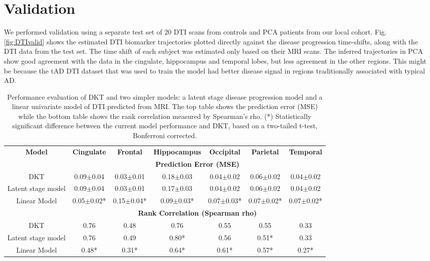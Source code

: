 \documentclass{llncs}
\begin{document}
\section{Validation}

We performed validation using a separate test set of 20 DTI scans from controls and PCA patients from our local cohort. Fig. \ref{fig:DTIvalid} shows the estimated DTI biomarker trajectories plotted directly against the disease progression time-shifts, along with the DTI data from the test set. The time shift of each subject was estimated only based on their MRI scans. The inferred trajectories in PCA show good agreement with the data in the cingulate, hippocampus and temporal lobes, but less agreement in the other regions. This might be because the tAD DTI dataset that was used to train the model had better disease signal in regions traditionally associated with typical AD.


\begin{table}
\begin{tabular}{c | c c c c c c}
\textbf{Model} & \textbf{Cingulate} & \textbf{Frontal} & \textbf{Hippocampus} & \textbf{Occipital} & \textbf{Parietal} & \textbf{Temporal}\\
& \multicolumn{6}{c}{\textbf{Prediction Error (MSE)}}\\
DKT & 0.09$\pm$0.04 & 0.03$\pm$0.01 & 0.18$\pm$0.03 & 0.04$\pm$0.02 & 0.06$\pm$0.02 & 0.04$\pm$0.02\\
Latent stage model & 0.09$\pm$0.04 & 0.03$\pm$0.01 & 0.17$\pm$0.03 & 0.04$\pm$0.02 & 0.06$\pm$0.02 & 0.04$\pm$0.02\\
Linear Model & 0.05$\pm$0.02* & 0.15$\pm$0.04* & 0.09$\pm$0.03* & 0.07$\pm$0.03* & 0.07$\pm$0.02* & 0.07$\pm$0.02*\\
& \multicolumn{6}{c}{\textbf{Rank Correlation (Spearman rho)}}\\
DKT  & 0.76  & 0.48  & 0.76  & 0.55  & 0.55  & 0.33 \\
Latent stage model  & 0.76  & 0.49  & 0.80*  & 0.56  & 0.51*  & 0.33 \\
Linear Model  & 0.48*  & 0.31*  & 0.64*  & 0.61*  & 0.57*  & 0.27* \\
\end{tabular}
\caption[Performance evaluation of DKT and two simpler models]{Performance evaluation of DKT and two simpler models: a latent stage disease progression model and a linear univariate model of DTI predicted from MRI. The top table shows the prediction error (MSE) while the bottom table shows the rank correlation measured by Spearman's rho. (*) Statistically significant difference between the current model performance and DKT, based on a two-tailed t-test, Bonferroni corrected.}
\label{sec:dktPerfMetrics}
\end{table}
\end{document}
